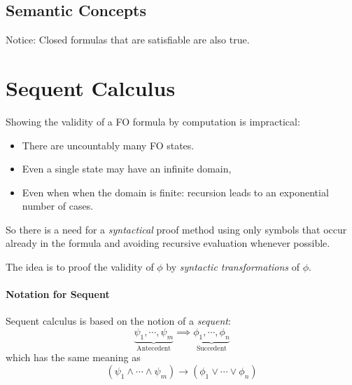 		\subsection{Semantic Concepts}
		
			Notice: Closed formulas that are satisfiable are also true.

	\section{Sequent Calculus} %
		Showing the validity of a FO formula by computation is impractical:
		\begin{itemize}
			\item There are uncountably many FO states.
			\item Even a single state may have an infinite domain,
			\item Even when when the domain is finite: recursion leads to an exponential number of cases.
		\end{itemize}
		So there is a need for a \textit{syntactical} proof method using only symbols that occur already in the formula and avoiding recursive evaluation whenever possible.
		
		The idea is to proof the validity of \(\phi\) by \textit{syntactic transformations} of \(\phi\).
		
		\paragraph{Notation for Sequent}
			Sequent calculus is based on the notion of a \textit{sequent}:
			\begin{equation*}
				\underbrace{\psi_1, \cdots, \psi_m}_\textrm{Antecedent} \implies \underbrace{\phi_1, \cdots, \phi_n}_\textrm{Succedent}
			\end{equation*}
			which has the same meaning as
			\begin{equation*}
				(\psi_1 \land \cdots \land \psi_m) \to (\phi_1 \lor \cdots \lor \phi_n)
			\end{equation*}
			
